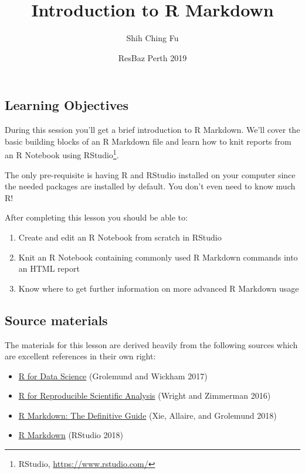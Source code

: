 \documentclass[]{article}
\title{Introduction to R Markdown}
\author{Shih Ching Fu}
\date{ResBaz Perth 2019}
\providecommand{\tightlist}{%
  \setlength{\itemsep}{0pt}\setlength{\parskip}{0pt}}
\let\rmarkdownfootnote\footnote%
\def\footnote{\protect\rmarkdownfootnote}
\begin{document}
\maketitle

\hypertarget{learning-objectives}{%
\subsection{Learning Objectives}\label{learning-objectives}}

During this session you'll get a brief introduction to R Markdown. We'll
cover the basic building blocks of an R Markdown file and learn how to
knit reports from an R Notebook using RStudio\footnote{RStudio,
  \url{https://www.rstudio.com/}}.

The only pre-requisite is having R and RStudio installed on your
computer since the needed packages are installed by default. You don't
even need to know much R!

After completing this lesson you should be able to:

\begin{enumerate}
\def\labelenumi{\arabic{enumi}.}
\tightlist
\item
  Create and edit an R Notebook from scratch in RStudio
\item
  Knit an R Notebook containing commonly used R Markdown commands into
  an HTML report
\item
  Know where to get further information on more advanced R Markdown
  usage
\end{enumerate}

\hypertarget{source-materials}{%
\subsection{Source materials}\label{source-materials}}

The materials for this lesson are derived heavily from the following
sources which are excellent references in their own right:

\begin{itemize}
\tightlist
\item
  \href{https://r4ds.had.co.nz/}{R for Data Science} (Grolemund and
  Wickham 2017)
\item
  \href{http://swcarpentry.github.io/r-novice-gapminder/}{R for
  Reproducible Scientific Analysis} (Wright and Zimmerman 2016)
\item
  \href{https://bookdown.org/yihui/rmarkdown/}{R Markdown: The
  Definitive Guide} (Xie, Allaire, and Grolemund 2018)
\item
  \href{https://rmarkdown.rstudio.com/lesson-1.html}{R Markdown}
  (RStudio 2018)
\end{itemize}
\end{document}

